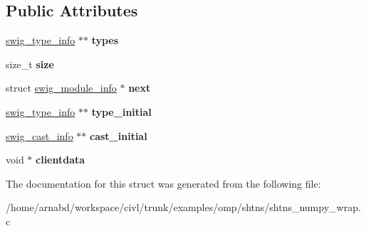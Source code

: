 \subsection*{Public Attributes}
\begin{DoxyCompactItemize}
\item 
\hypertarget{structswig__module__info_ad658c7738e9a035ef8eea865322fbf13}{}\hyperlink{structswig__type__info}{swig\+\_\+type\+\_\+info} $\ast$$\ast$ {\bfseries types}\label{structswig__module__info_ad658c7738e9a035ef8eea865322fbf13}

\item 
\hypertarget{structswig__module__info_aaf8907cf8509ee0464af8c9dfd909042}{}size\+\_\+t {\bfseries size}\label{structswig__module__info_aaf8907cf8509ee0464af8c9dfd909042}

\item 
\hypertarget{structswig__module__info_ac177d150b85ab77122089acf1f06d9c6}{}struct \hyperlink{structswig__module__info}{swig\+\_\+module\+\_\+info} $\ast$ {\bfseries next}\label{structswig__module__info_ac177d150b85ab77122089acf1f06d9c6}

\item 
\hypertarget{structswig__module__info_a76c7d5b0fc10371748616d0b6c815a17}{}\hyperlink{structswig__type__info}{swig\+\_\+type\+\_\+info} $\ast$$\ast$ {\bfseries type\+\_\+initial}\label{structswig__module__info_a76c7d5b0fc10371748616d0b6c815a17}

\item 
\hypertarget{structswig__module__info_a15f6b50a41f144afb1148fc412dc01f7}{}\hyperlink{structswig__cast__info}{swig\+\_\+cast\+\_\+info} $\ast$$\ast$ {\bfseries cast\+\_\+initial}\label{structswig__module__info_a15f6b50a41f144afb1148fc412dc01f7}

\item 
\hypertarget{structswig__module__info_a9fb6e461fcaf14c209049adfae4e9754}{}void $\ast$ {\bfseries clientdata}\label{structswig__module__info_a9fb6e461fcaf14c209049adfae4e9754}

\end{DoxyCompactItemize}


The documentation for this struct was generated from the following file\+:\begin{DoxyCompactItemize}
\item 
/home/arnabd/workspace/civl/trunk/examples/omp/shtns/shtns\+\_\+numpy\+\_\+wrap.\+c\end{DoxyCompactItemize}
